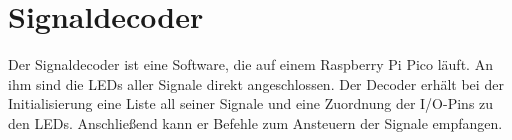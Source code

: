\section{Signaldecoder}\label{text:Entwicklung-des-Stellwerks:Signaldecoder}

Der Signaldecoder ist eine Software, die auf einem Raspberry Pi Pico läuft. An ihm sind die LEDs aller Signale direkt angeschlossen. Der Decoder erhält bei der Initialisierung eine Liste all seiner Signale und eine Zuordnung der I/O-Pins zu den LEDs. Anschließend kann er Befehle zum Ansteuern der Signale empfangen.
